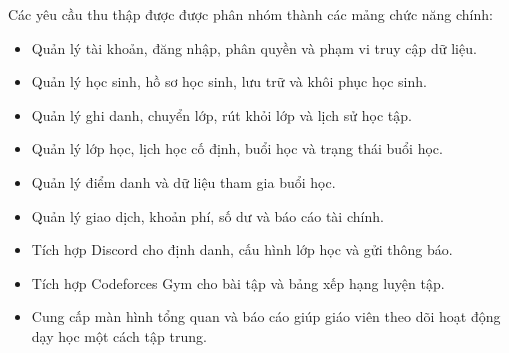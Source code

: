 \documentclass[12pt,a4paper]{article}
\begin{document}
Các yêu cầu thu thập được được phân nhóm thành các mảng chức năng chính:

\begin{itemize}[leftmargin=*]
    \item Quản lý tài khoản, đăng nhập, phân quyền và phạm vi truy cập dữ liệu.
    \item Quản lý học sinh, hồ sơ học sinh, lưu trữ và khôi phục học sinh.
    \item Quản lý ghi danh, chuyển lớp, rút khỏi lớp và lịch sử học tập.
    \item Quản lý lớp học, lịch học cố định, buổi học và trạng thái buổi học.
    \item Quản lý điểm danh và dữ liệu tham gia buổi học.
    \item Quản lý giao dịch, khoản phí, số dư và báo cáo tài chính.
    \item Tích hợp Discord cho định danh, cấu hình lớp học và gửi thông báo.
    \item Tích hợp Codeforces Gym cho bài tập và bảng xếp hạng luyện tập.
    \item Cung cấp màn hình tổng quan và báo cáo giúp giáo viên theo dõi hoạt động dạy
    học một cách tập trung.
\end{itemize}
\end{document}
